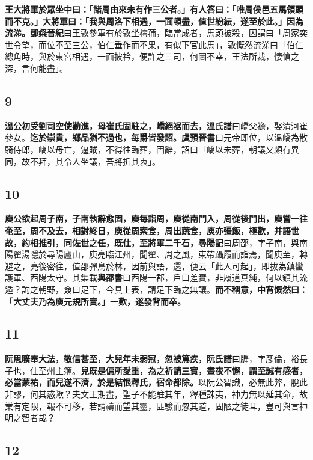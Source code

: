 \textbf{王大將軍於眾坐中曰：「諸周由來未有作三公者。」有人答曰：「唯周侯邑五馬領頭而不克。」大將軍曰：「我與周洛下相遇，一面頓盡，值世紛紜，遂至於此。」因為流涕。}{\footnotesize \textbf{鄧粲晉紀}曰王敦參軍有於敦坐樗蒱，臨當成者，馬頭被殺，因謂曰「周家奕世令望，而位不至三公，伯仁垂作而不果，有似下官此馬」，敦慨然流涕曰「伯仁總角時，與於東宮相遇，一面披衿，便許之三司，何圖不幸，王法所裁，悽愴之深，言何能盡」。}

\subsection*{9}

\textbf{溫公初受劉司空使勸進，母崔氏固駐之，嶠絕裾而去，}{\footnotesize \textbf{溫氏譜}曰嶠父襜，娶清河崔參女。}\textbf{迄於崇貴，鄉品猶不過也，每爵皆發詔。}{\footnotesize \textbf{虞預晉書}曰元帝即位，以溫嶠為散騎侍郎，嶠以母亡，逼賊，不得往臨葬，固辭，詔曰「嶠以未葬，朝議又頗有異同，故不拜，其令人坐議，吾將折其衷」。}

\subsection*{10}

\textbf{庾公欲起周子南，子南執辭愈固，庾每詣周，庾從南門入，周從後門出，庾嘗一往奄至，周不及去，相對終日，庾從周索食，周出蔬食，庾亦彊飯，極歡，并語世故，約相推引，同佐世之任，既仕，至將軍二千石，}{\footnotesize \textbf{尋陽記}曰周邵，字子南，與南陽翟湯隱於尋陽廬山，庾亮臨江州，聞翟、周之風，束帶躡履而詣焉，聞庾至，轉避之，亮後密往，值邵彈鳥於林，因前與語，還，便云「此人可起」，即拔為鎮蠻護軍、西陽太守。其集載\textbf{與邵書}曰西陽一郡，戶口差實，非履道真純，何以鎮其流遁？詢之朝野，僉曰足下，今具上表，請足下臨之無讓。}\textbf{而不稱意，中宵慨然曰：「大丈夫乃為庾元規所賣。」一歎，遂發背而卒。}

\subsection*{11}

\textbf{阮思曠奉大法，敬信甚至，大兒年未弱冠，忽被篤疾，}{\footnotesize \textbf{阮氏譜}曰牖，字彥倫，裕長子也，仕至州主簿。}\textbf{兒既是偏所愛重，為之祈請三寶，晝夜不懈，謂至誠有感者，必當蒙祐，而兒遂不濟，於是結恨釋氏，宿命都除。}{\footnotesize 以阮公智識，必無此弊，脫此非謬，何其惑歟？夫文王期盡，聖子不能駐其年，釋種誅夷，神力無以延其命，故業有定限，報不可移，若請禱而望其靈，匪驗而忽其道，固陋之徒耳，豈可與言神明之智者哉？}

\subsection*{12}

